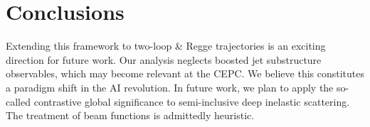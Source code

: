 \section{Conclusions}\label{sec:conclusions}

Extending this framework to two-loop & Regge trajectories is an exciting
direction for future work. Our analysis neglects boosted jet
substructure observables, which may become relevant at the CEPC. We
believe this constitutes a paradigm shift in the AI revolution. In
future work, we plan to apply the so-called contrastive global
significance to semi-inclusive deep inelastic scattering. The treatment
of beam functions is admittedly heuristic.

